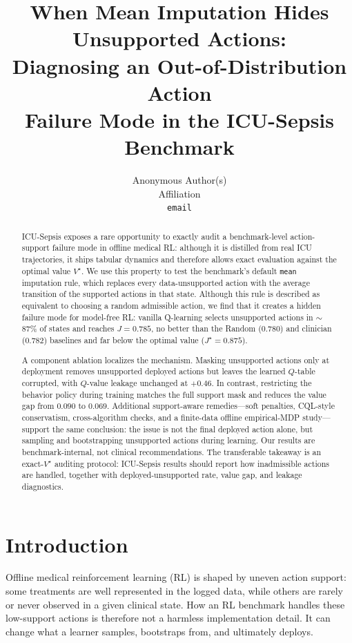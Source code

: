 \documentclass{article}
\title{When Mean Imputation Hides Unsupported Actions:\\
Diagnosing an Out-of-Distribution Action\\
Failure Mode in the ICU-Sepsis Benchmark}
\author{%
  Anonymous Author(s)\\
  Affiliation\\
  \texttt{email}\\
}
\begin{document}
\maketitle

\begin{abstract}
ICU-Sepsis exposes a rare opportunity to exactly audit a benchmark-level
action-support failure mode in offline medical RL: although it is distilled from
real ICU trajectories, it ships tabular
dynamics and therefore allows exact evaluation against the optimal value
$V^\star$. We use this property to test the benchmark's default \texttt{mean}
imputation rule, which replaces every data-unsupported action with the average
transition of the supported actions in that state. Although this rule is described
as equivalent to choosing a random admissible action, we find that it creates a
hidden failure mode for model-free RL: vanilla Q-learning selects unsupported
actions in $\sim$87\% of states and reaches $J{=}0.785$, no better than the Random
(0.780) and clinician (0.782) baselines and far below the optimal value
($J^\star{=}0.875$).

A component ablation localizes the mechanism. Masking unsupported actions only at
deployment removes unsupported deployed actions but leaves the learned $Q$-table
corrupted, with $Q$-value leakage unchanged at $+0.46$. In contrast, restricting
the behavior policy during training matches the full support mask and reduces the
value gap from $0.090$ to $0.069$. Additional support-aware remedies---soft
penalties, CQL-style conservatism, cross-algorithm checks, and a finite-data
offline empirical-MDP study---support the same conclusion: the issue is not the
final deployed action alone, but sampling and bootstrapping unsupported actions
during learning. Our results are benchmark-internal, not clinical
recommendations. The transferable takeaway is an exact-$V^\star$ auditing
protocol: ICU-Sepsis results should report how inadmissible actions are handled,
together with deployed-unsupported rate, value gap, and leakage diagnostics.
\end{abstract}

\section{Introduction}
\label{sec:intro}
Offline medical reinforcement learning (RL) is shaped by uneven action support:
some treatments are well represented in the logged data, while others are rarely
or never observed in a given clinical state. How an RL benchmark handles these
low-support actions is therefore not a harmless implementation detail. It can
change what a learner samples, bootstraps from, and ultimately deploys.
\end{document}
